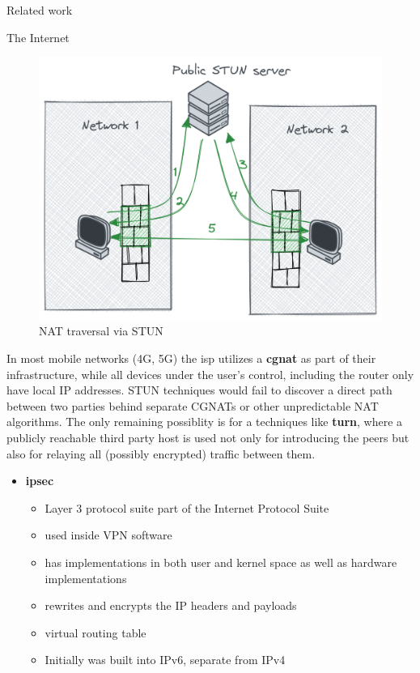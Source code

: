 \begin{frame}[fragile]{Related work}
\begin{block}{The Internet}
\begin{figure}
\centering
\includegraphics[width=\textwidth,height=0.25\textheight]{thesis/../figures/nat-traversal.png}
\caption{NAT traversal via STUN\label{nat-traversal}}
\end{figure}

In most mobile networks (4G, 5G) the \gls{isp} utilizes a
\textbf{\gls{cgnat}} as part of their infrastructure, while all devices
under the user's control, including the router only have local IP
addresses. STUN techniques would fail to discover a direct path between
two parties behind separate CGNATs or other unpredictable NAT
algorithms. The only remaining possiblity is for a techniques like
\textbf{\acrfull{turn}}, where a publicly reachable third party host is
used not only for introducing the peers but also for relaying all
(possibly encrypted) traffic between them.

\begin{itemize}
\tightlist
\item
  \textbf{\acrfull{ipsec}}

  \begin{itemize}
  \tightlist
  \item
    Layer 3 protocol suite part of the Internet Protocol Suite
  \item
    used inside VPN software
  \item
    has implementations in both user and kernel space as well as
    hardware implementations
  \item
    rewrites and encrypts the IP headers and payloads
  \item
    virtual routing table
  \item
    Initially was built into IPv6, separate from IPv4
  \end{itemize}
\end{itemize}
\end{block}


\end{frame}
